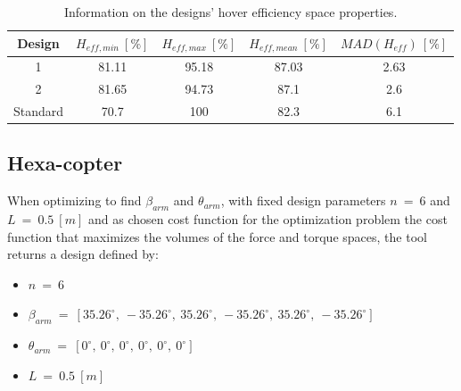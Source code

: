 \begin{table}[!ht]
\begin{center}
 \caption{Information on the designs’ torque space properties.}\vspace{1ex}
 \label{tab:tab_Quad_compare_torque}
\end{center}
\end{table}

\begin{table}[!ht]
\begin{center}
 \caption{Information on the designs’ hover efficiency space properties.}\vspace{1ex}
 \label{tab:tab_Quad_compare_hover}
 {\scriptsize\begin{tabular}{|c|cccc|}
 \hline
  Design & $H_{eff,min}\ [\%]$ & $H_{eff,max}\ [\%]$ & $H_{eff,mean}\ [\%]$
  & $MAD(H_{eff})\ [\%]$\\ \hline
  1 & 81.11 & 95.18 & 87.03 & 2.63\\
  2 & 81.65 & 94.73 & 87.1 & 2.6\\
  Standard & 70.7 & 100 & 82.3 & 6.1\\
 \hline
\end{tabular}}
\end{center}
\end{table}

\subsection{Hexa-copter}
\label{sec:hexa_copter}

When optimizing to find $\beta_{arm}$ and $\theta_{arm}$, with fixed
design parameters $n\ =\ 6$ and $L\ =\ 0.5\ [m]$ and as chosen cost function
for the optimization problem the cost function that maximizes the volumes
of the force and torque spaces, the tool returns a design defined by:

{\small\begin{itemize}
  \item $n\ =\ 6$
  \item $\beta_{arm}\ =\ [35.26^{\circ},\  -35.26^{\circ},\  35.26^{\circ},\  -35.26^{\circ},\
                          35.26^{\circ},\  -35.26^{\circ}]$
  \item $\theta_{arm}\ =\ [0^{\circ},\  0^{\circ},\  0^{\circ},\  0^{\circ},\ 0^{\circ},\  0^{\circ}]$
  \item $L\ =\ 0.5\ [m]$
\end{itemize}}

